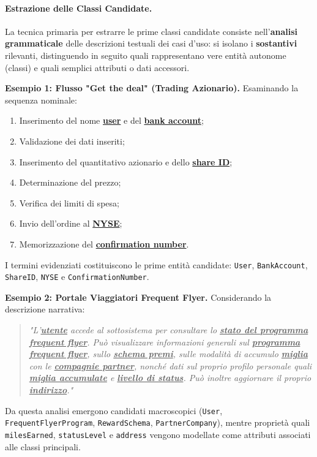 \documentclass[12pt]{extarticle}
\begin{document}
\paragraph{Estrazione delle Classi Candidate.}
La tecnica primaria per estrarre le prime classi candidate consiste nell'\textbf{analisi grammaticale} delle descrizioni testuali dei casi d'uso: si isolano i \textbf{sostantivi} rilevanti, distinguendo in seguito quali rappresentano vere entità autonome (classi) e quali semplici attributi o dati accessori.

\noindent\textbf{Esempio 1: Flusso "Get the deal" (Trading Azionario).}
Esaminando la sequenza nominale:
\begin{enumerate}
    \item Inserimento del nome \underline{\textbf{user}} e del \underline{\textbf{bank account}};
    \item Validazione dei dati inseriti;
    \item Inserimento del quantitativo azionario e dello \underline{\textbf{share ID}};
    \item Determinazione del prezzo;
    \item Verifica dei limiti di spesa;
    \item Invio dell'ordine al \underline{\textbf{NYSE}};
    \item Memorizzazione del \underline{\textbf{confirmation number}}.
\end{enumerate}
I termini evidenziati costituiscono le prime entità candidate: \texttt{User}, \texttt{BankAccount}, \texttt{ShareID}, \texttt{NYSE} e \texttt{ConfirmationNumber}.

\noindent\textbf{Esempio 2: Portale Viaggiatori Frequent Flyer.}
Considerando la descrizione narrativa:
\begin{quote}
    \textit{"L'\underline{\textbf{utente}} accede al sottosistema per consultare lo \underline{\textbf{stato del programma frequent flyer}}. Può visualizzare informazioni generali sul \underline{\textbf{programma frequent flyer}}, sullo \underline{\textbf{schema premi}}, sulle modalità di accumulo \underline{\textbf{miglia}} con le \underline{\textbf{compagnie partner}}, nonché dati sul proprio profilo personale quali \underline{\textbf{miglia accumulate}} e \underline{\textbf{livello di status}}. Può inoltre aggiornare il proprio \underline{\textbf{indirizzo}}."}
\end{quote}
Da questa analisi emergono candidati macroscopici (\texttt{User}, \texttt{FrequentFlyerProgram}, \texttt{RewardSchema}, \texttt{PartnerCompany}), mentre proprietà quali \texttt{milesEarned}, \texttt{statusLevel} e \texttt{address} vengono modellate come attributi associati alle classi principali.
\end{document}
